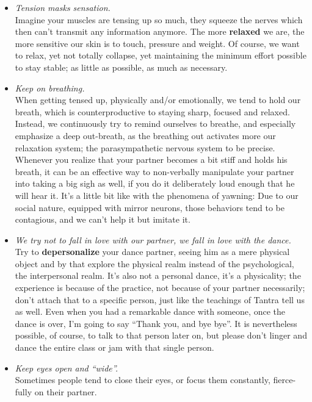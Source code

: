 \begin{itemize}
    \item [] \textit{Tension masks sensation.} \\
    Imagine your muscles are tensing up so much, they squeeze the nerves which then can't transmit any information anymore.
    The more \textbf{relaxed} we are, the more sensitive our skin is to touch, pressure and weight.
    Of course, we want to relax, yet not totally collapse, yet maintaining the minimum effort possible to stay stable; as little as possible, as much as necessary.
    \item [] \textit{Keep on breathing.} \\
    When getting tensed up, physically and/or emotionally, we tend to hold our breath, which is counterproductive to staying sharp, focused and relaxed.
    Instead, we continuously try to remind ourselves to breathe, and especially emphasize a deep out-breath, as the breathing out activates more our relaxation system; the parasympathetic nervous system to be precise.
    Whenever you realize that your partner becomes a bit stiff and holds his breath, it can be an effective way to non-verbally manipulate your partner into taking a big sigh as well, if you do it deliberately loud enough that he will hear it.
    It's a little bit like with the phenomena of yawning: Due to our social nature, equipped with mirror neurons, those behaviors tend to be contagious, and we can't help it but imitate it.
    \item [] \textit{We try not to fall in love with our partner, we fall in love with the dance.} \\
    Try to \textbf{depersonalize} your dance partner, seeing him as a mere physical object and by that explore the physical realm instead of the psychological, the interpersonal realm.
    It's also not a personal dance, it's a physicality; the experience is because of the practice, not because of your partner necessarily; don't attach that to a specific person, just like the teachings of Tantra tell us as well.
    Even when you had a remarkable dance with someone, once the dance is over, I'm going to say ``Thank you, and bye bye''.
    It is nevertheless possible, of course, to talk to that person later on, but please don't linger and dance the entire class or jam with that single person.
    \item [] \textit{Keep eyes open and ``wide''.} \\
    Sometimes people tend to close their eyes, or focus them constantly, fierce-fully on their partner.

\end{itemize}
